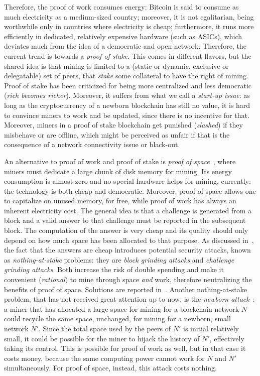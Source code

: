 Therefore, the proof of work consumes energy: Bitcoin is said to consume as much electricity as
a medium-sized country; moreover, it is not egalitarian, being
worthwhile only in countries where electricity is cheap; furthermore, it
runs more efficiently in dedicated, relatively expensive hardware (such as ASICs),
which deviates much from the idea of a democratic and open network.
Therefore, the current trend is towards a \emph{proof of stake}.
This comes in different flavors, but
the shared idea is that mining is limited to a (static or dynamic, exclusive or delegatable)
set of peers, that \emph{stake} some collateral to have the right of mining.
Proof of stake has been criticized for being more centralized and less democratic
(\emph{rich becomes richer}).
Moreover, it suffers from what we call a \emph{start-up issue}: as long as the cryptocurrency
of a newborn blockchain has still no value, it is hard to convince miners to work and
be updated, since there is no incentive for that. Moreover, miners in
a proof of stake blockchain get punished (\emph{slashed}) if they misbehave or are offline, which
might be perceived as unfair if that is the consequence of a network connectivity issue or black-out.

An alternative to proof of work and proof of stake is
\emph{proof of space}~\cite{AtenieseBFG14,DziembowskiFKP15}, where
miners must dedicate a large chunk of disk memory for mining.
Its energy consumption is almost zero and no special
hardware helps for mining, currently: the technology is both cheap
and democratic. Moreover, proof of space allows
one to capitalize on unused memory, for free, while proof of work has always an
inherent electricity cost.
The general idea is that a challenge is generated from
a block and a valid answer to that challenge must be reported in the subsequent block.
The computation of the answer is very cheap and its quality should only depend
on how much space has been allocated to that purpose. As discussed in~\cite{ParkKFGAP18},
the fact that the answers are cheap introduces potential security attacks,
known as \emph{nothing-at-stake} problems: they are \emph{block grinding attacks}
and \emph{challenge grinding attacks}.
Both increase the risk of double spending and make it convenient
(\emph{rational}) to mine through space \emph{and} work, therefore neutralizing the benefits
of proof of space. Solutions are reported in~\cite{ParkKFGAP18}.
Another nothing-at-stake problem, that has not received great attention up to now,
is the \emph{newborn attack}~\cite{TangZDWLG0L19}: a miner that has allocated a large space
for mining for a blockchain network $N$ could recycle the same space, unchanged, for
mining for a newborn, small network $N'$. Since the total space used by the peers of $N'$ is
initial relatively small, it could be possible for the miner to hijack the history of $N'$,
effectively taking its control. This is possible for proof of work as well, but in that
case it costs money, because the same computing power cannot work for $N$ and $N'$ simultaneously.
For proof of space, instead, this attack costs nothing.

